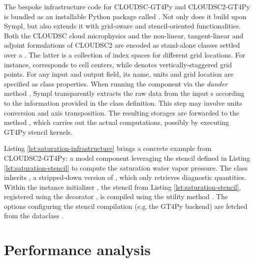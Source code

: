 \documentclass[gmd,manuscript,online]{copernicus}
\theoremstyle{theorem}
\theoremstyle{definition}
\theoremstyle{remark}
\theoremstyle{proposition}
\begin{document}
	The bespoke infrastructure code for CLOUDSC-GT4Py and CLOUDSC2-GT4Py is bundled as an installable Python package called . Not only does it build upon Sympl, but also extends it with grid-aware and stencil-oriented functionalities. Both the CLOUDSC cloud microphysics and the non-linear, tangent-linear and adjoint formulations of CLOUDSC2 are encoded as stand-alone  classes settled over a . The latter is a collection of index spaces for different grid locations. For instance,  corresponds to cell centers, while  denotes vertically-staggered grid points. For any input and output field, its name, units and grid location are specified as class properties. When running the component via the \emph{dunder} method , Sympl transparently extracts the raw data from the input s according to the information provided in the class definition. This step may involve units conversion and axis transposition. The resulting storages are forwarded to the method , which carries out the actual computations, possibly by executing GT4Py stencil kernels.

	Listing \ref{lst:saturation-infrastructure} brings a concrete example from CLOUDSC2-GT4Py: a model component leveraging the stencil defined in Listing \ref{lst:saturation-stencil} to compute the saturation water vapor pressure. The class inherits , a stripped-down version of , which only retrieves diagnostic quantities. Within the instance initializer , the stencil from Listing \ref{lst:saturation-stencil}, registered using the decorator , is compiled using the utility method . The options configuring the stencil compilation (e.g.\,the GT4Py backend) are fetched from the dataclass .

	\section{Performance analysis}
	\label{section:performance-analysis}
\end{document}
